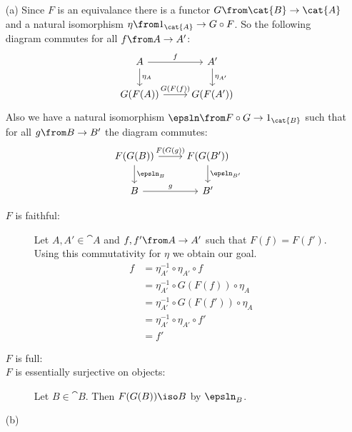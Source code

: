 \begin{answer}
    \begin{itemize}
        \item[(a)]
            Since $F$ is an equivalance there is a functor $G\from \cat{B} \to \cat{A}$ and a natural isomorphism $\eta\from 1_{\cat{A}} \to G \circ F$.
            So the following diagram commutes for all $f\from A \to A'$:
            \[
                \begin{tikzcd}
                    A \arrow{r}{f} \arrow{d}{\eta_A} & A' \arrow{d}{\eta_{A'}} \\
                    G(F(A)) \arrow{r}{G(F(f))}       & G(F(A'))
                \end{tikzcd}
            \]
            Also we have a natural isomorphism $\epsln\from F \circ G \to 1_{\cat{B}}$ such that for all $g\from B \to B'$ the diagram commutes:
            \[
                \begin{tikzcd}
                    F(G(B)) \arrow{d}{\epsln_{B}} \arrow{r}{F(G(g))} & F(G(B')) \arrow{d}{\epsln_{B'}} \\
                    B \arrow{r}{g}  & B'
                \end{tikzcd}
            \]
            \begin{description}
                \item[$F$ is faithful:]
                    Let $A, A' \in \cat{A}$ and $f,f'\from A \to A'$ such that $F(f) = F(f')$.
                    Using this commutativity for $\eta$ we obtain our goal.
                    \begin{align*}
                        f & = \eta_{A'}^{-1} \circ \eta_{A'} \circ f\\
                          & = \eta_{A'}^{-1} \circ G(F(f)) \circ \eta_A\\
                          & = \eta_{A'}^{-1} \circ G(F(f')) \circ \eta_A\\
                          & = \eta_{A'}^{-1} \circ \eta_{A'} \circ f'\\
                          & = f'
                    \end{align*}
                \item[$F$ is full:]
                \item[$F$ is essentially surjective on objects:]
                    Let $B \in \cat{B}$.
                    Then $F(G(B)) \iso B$ by $\epsln_B$.
            \end{description}
        \item[(b)]

\end{itemize}
\end{answer}
